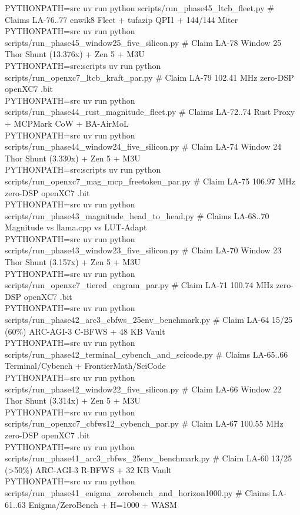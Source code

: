\documentclass[10pt]{article}
\begin{document}
{{    PYTHONPATH=src uv run python scripts/run\_phase45\_ltcb\_fleet.py \# Claims LA-76..77 enwik8 Fleet + tufazip QPI1 + 144/144 Miter\\
    PYTHONPATH=src uv run python scripts/run\_phase45\_window25\_five\_silicon.py \# Claim LA-78 Window 25 Thor Shunt (13.376x) + Zen 5 + M3U\\
    PYTHONPATH=src:scripts uv run python scripts/run\_openxc7\_ltcb\_kraft\_par.py \# Claim LA-79 102.41 MHz zero-DSP openXC7 .bit\\
    PYTHONPATH=src uv run python scripts/run\_phase44\_rust\_magnitude\_fleet.py \# Claims LA-72..74 Rust Proxy + MCPMark CoW + BA-AirMoL\\
    PYTHONPATH=src uv run python scripts/run\_phase44\_window24\_five\_silicon.py \# Claim LA-74 Window 24 Thor Shunt (3.330x) + Zen 5 + M3U\\
    PYTHONPATH=src:scripts uv run python scripts/run\_openxc7\_mag\_mcp\_freetoken\_par.py \# Claim LA-75 106.97 MHz zero-DSP openXC7 .bit\\
    PYTHONPATH=src uv run python scripts/run\_phase43\_magnitude\_head\_to\_head.py \# Claims LA-68..70 Magnitude vs llama.cpp vs LUT-Adapt\\
    PYTHONPATH=src uv run python scripts/run\_phase43\_window23\_five\_silicon.py \# Claim LA-70 Window 23 Thor Shunt (3.157x) + Zen 5 + M3U\\
    PYTHONPATH=src uv run python scripts/run\_openxc7\_tiered\_engram\_par.py \# Claim LA-71 100.74 MHz zero-DSP openXC7 .bit\\
    PYTHONPATH=src uv run python scripts/run\_phase42\_arc3\_cbfws\_25env\_benchmark.py \# Claim LA-64 15/25 (60\%) ARC-AGI-3 C-BFWS + 48 KB Vault\\
    PYTHONPATH=src uv run python scripts/run\_phase42\_terminal\_cybench\_and\_scicode.py \# Claims LA-65..66 Terminal/Cybench + FrontierMath/SciCode\\
    PYTHONPATH=src uv run python scripts/run\_phase42\_window22\_five\_silicon.py \# Claim LA-66 Window 22 Thor Shunt (3.314x) + Zen 5 + M3U\\
    PYTHONPATH=src uv run python scripts/run\_openxc7\_cbfws12\_cybench\_par.py \# Claim LA-67 100.55 MHz zero-DSP openXC7 .bit\\
    PYTHONPATH=src uv run python scripts/run\_phase41\_arc3\_rbfws\_25env\_benchmark.py \# Claim LA-60 13/25 (>50\%) ARC-AGI-3 R-BFWS + 32 KB Vault\\
    PYTHONPATH=src uv run python scripts/run\_phase41\_enigma\_zerobench\_and\_horizon1000.py \# Claims LA-61..63 Enigma/ZeroBench + H=1000 + WASM\\
}}
\end{document}
